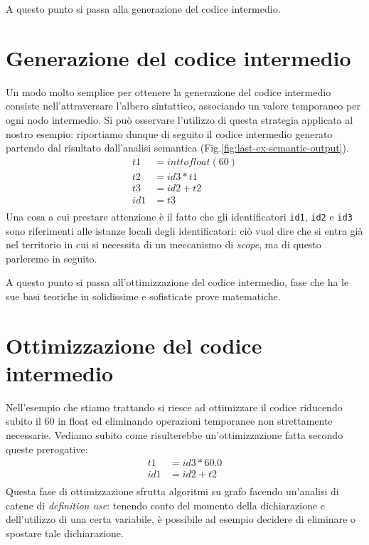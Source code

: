 \documentclass[class=book, crop=false, oneside, 12pt]{standalone}
\begin{document}
A questo punto si passa alla generazione del codice intermedio.

\section{Generazione del codice intermedio}
Un modo molto semplice per ottenere la generazione del codice intermedio consiste nell'attraversare l'albero sintattico, associando un valore temporaneo per ogni nodo intermedio.
Si può osservare l'utilizzo di questa strategia applicata al nostro esempio: riportiamo dunque di seguito il codice intermedio generato partendo dal risultato dall'analisi semantica (Fig.\ref{fig:last-ex-semantic-output}).
\begin{align*}
    t1 &= inttofloat(60) \\
    t2 &= id3 * t1 \\
    t3 &= id2 + t2 \\
    id1 &= t3 \\
\end{align*}
Una cosa a cui prestare attenzione è il fatto che gli identificatori \texttt{id1}, \texttt{id2} e \texttt{id3} sono riferimenti alle istanze locali degli identificatori: ciò vuol dire che si entra già nel territorio in cui si necessita di un meccanismo di \emph{scope}, ma di questo parleremo in seguito.

A questo punto si passa all'ottimizzazione del codice intermedio, fase che ha le sue basi teoriche in solidissime e sofisticate prove matematiche.

\section{Ottimizzazione del codice intermedio}
Nell'esempio che stiamo trattando si riesce ad ottimizzare il codice riducendo subito il \(60\) in float ed eliminando operazioni temporanee non strettamente necessarie. Vediamo subito come risulterebbe un'ottimizzazione fatta secondo queste prerogative:
\begin{align*}
    t1 &= id3 * 60.0 \\
    id1 &= id2 + t2 \\
\end{align*}
Questa fase di ottimizzazione sfrutta algoritmi su grafo facendo un'analisi di catene di \emph{definition use}: tenendo conto del momento della dichiarazione e dell'utilizzo di una certa variabile, è possibile ad esempio decidere di eliminare o spostare tale dichiarazione.
\end{document}
